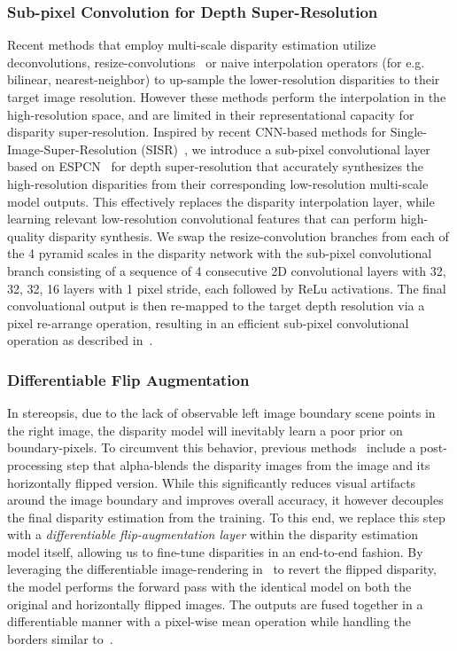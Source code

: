 \documentclass[letterpaper, 10 pt, conference]{ieeeconf}  \IEEEoverridecommandlockouts
\begin{document}
\subsubsection{Sub-pixel Convolution for Depth Super-Resolution}
Recent methods that employ multi-scale disparity estimation utilize deconvolutions, resize-convolutions~\cite{odena2016deconvolution} or naive interpolation operators (for e.g. bilinear, nearest-neighbor) to up-sample the lower-resolution disparities to their target image resolution.
However these methods perform the interpolation in the high-resolution space, and are limited in their representational capacity for disparity super-resolution. Inspired by recent CNN-based methods for Single-Image-Super-Resolution (SISR)~\cite{shi2016real}, we introduce a sub-pixel convolutional layer based on ESPCN~\cite{shi2016real} for depth super-resolution that accurately synthesizes the high-resolution disparities from their corresponding low-resolution multi-scale model outputs. 
This effectively replaces the disparity interpolation layer, while learning relevant low-resolution convolutional features that can perform high-quality disparity synthesis. We swap the resize-convolution branches from each of the 4 pyramid scales in the disparity network with the sub-pixel convolutional branch consisting of a sequence of 4 consecutive 2D convolutional layers with 32, 32, 32, 16 layers with 1 pixel stride, each followed by ReLu activations. The final convoluational output is then re-mapped to the target depth resolution via a pixel re-arrange operation, resulting in an efficient sub-pixel convolutional operation as described in~\cite{shi2016real}.  



\subsubsection{Differentiable Flip Augmentation}
In stereopsis, due to the lack of observable left image boundary scene points in the right image, the disparity model will inevitably learn a poor prior on boundary-pixels. To circumvent this behavior, previous methods~\cite{godard2017unsupervised,godard2018digging} include a post-processing step that alpha-blends the disparity images from the image and its horizontally flipped version. While this significantly reduces visual artifacts around the image boundary and improves overall accuracy, it however decouples the final disparity estimation from the training. To this end, we replace this step with a \textit{differentiable flip-augmentation layer} within the disparity estimation model itself, allowing us to fine-tune disparities in an end-to-end fashion. By leveraging the differentiable image-rendering in~\cite{jaderberg2015spatial} to revert the flipped disparity, the model performs the forward pass with the identical model on both the original and horizontally flipped images. The outputs are fused together in a differentiable manner with a pixel-wise mean operation while handling the borders similar to~\cite{godard2017unsupervised}. 
\end{document}
